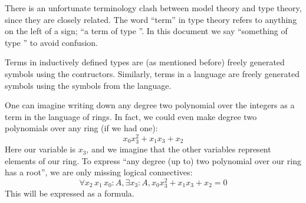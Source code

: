 \begin{rmk}
  There is an unfortunate terminology clash between model theory and type theory,
  since they are closely related.
  The word ``term'' in type theory refers to anything on the left of a \code{:} sign;
  ``a term of type ''.
  In this document we say ``something of type '' to avoid confusion.

  Terms in inductively defined types are (as mentioned before)
  freely generated symbols using the contructors.
  Similarly, terms in a language are freely generated symbols using
  the symbols from the language.
\end{rmk}

One can imagine writing down any degree two polynomial over the integers
as a term in the language of rings.
In fact, we could even make degree two polynomials over any ring (if we had one):
\[ x_{0} x_{3}^{2} + x_{1} x_{3} + x_{2} \]
Here our variable is $x_{3}$, and we imagine that the other variables represent
elements of our ring.
To express ``any degree (up to) two polynomial over our ring has a root'',
we are only missing logical connectives:
\[ \forall x_{2} \, x_{1} \, x_{0} : A, \exists x_{3} : A, x_{0} x_{3}^{2} + x_{1} x_{3} + x_{2} = 0 \]
This will be expressed as a formula.

